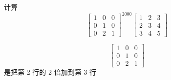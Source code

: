 \documentclass{article}
\begin{document}
\begin{examplle}[]
计算
\begin{equation*}
\begin{bmatrix}
1&0&0\\
0&1&0\\
0&2&1
\end{bmatrix}^{2000}
\begin{bmatrix}
1&2&3\\
2&3&4\\
3&4&5
\end{bmatrix}
\end{equation*}

\begin{equation*}
\begin{bmatrix}
1&0&0\\
0&1&0\\
0&2&1
\end{bmatrix}
\end{equation*}
是把第 2 行的 2 倍加到第 3 行
\end{examplle}
\end{document}
